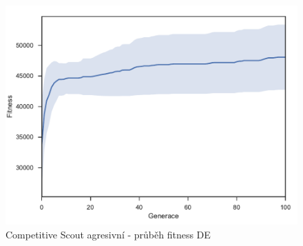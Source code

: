 \begin{figure}[p]\centering
	\includegraphics[width=\columnwidth]{../img/CompetitiveMap/ScoutAgresive}
	\caption{Competitive Scout agresivní - průběh fitness DE}
	\label{obr04:CompetitiveAgresive}
\end{figure}
\clearpage
